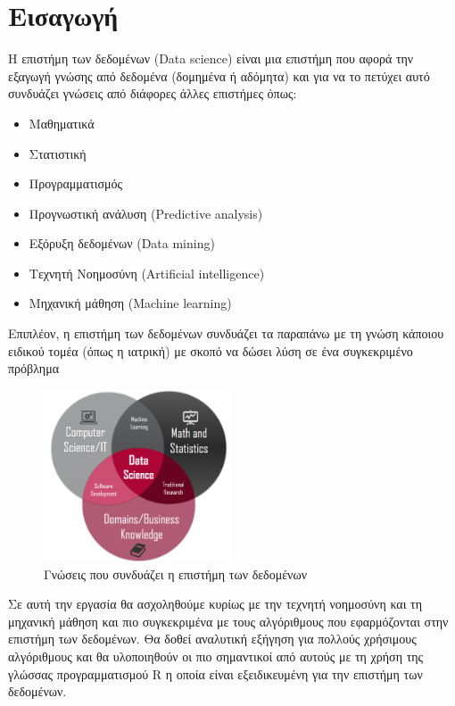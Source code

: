 \newpage
\section{Εισαγωγή}
Η επιστήμη των δεδομένων (\textlatin{Data science}) είναι
μια επιστήμη που αφορά την εξαγωγή γνώσης από δεδομένα 
(δομημένα ή αδόμητα) και για να το πετύχει αυτό συνδυάζει 
γνώσεις από διάφορες άλλες επιστήμες όπως:
\begin{itemize}
    \item Μαθηματικά
    \item Στατιστική
    \item Προγραμματισμός
    \item Προγνωστική ανάλυση (\textlatin{Predictive analysis})
    \item Εξόρυξη δεδομένων (\textlatin{Data mining})
    \item Τεχνητή Νοημοσύνη (\textlatin{Artificial intelligence})
    \item Μηχανική μάθηση (\textlatin{Machine learning})
\end{itemize}
Επιπλέον, η επιστήμη των δεδομένων συνδυάζει τα παραπάνω με
τη γνώση κάποιου ειδικού τομέα (όπως η ιατρική) με σκοπό να
δώσει λύση σε ένα συγκεκριμένο πρόβλημα \cite{wikiDS}
\begin{figure}[H]
    \centering
    \includegraphics[width=0.5\textwidth]{images/dataScienceKnowledge.png}
    \caption{Γνώσεις που συνδυάζει η επιστήμη των δεδομένων}
\end{figure}

Σε αυτή την εργασία θα ασχοληθούμε κυρίως με την τεχνητή
νοημοσύνη και τη μηχανική μάθηση και πιο συγκεκριμένα με τους
αλγόριθμους που εφαρμόζονται στην επιστήμη των δεδομένων.
Θα δοθεί αναλυτική εξήγηση για πολλούς χρήσιμους αλγόριθμους
και θα υλοποιηθούν οι πιο σημαντικοί από αυτούς με τη χρήση
της γλώσσας προγραμματισμού \textlatin{R} η οποία είναι 
εξειδικευμένη για την επιστήμη των δεδομένων.

